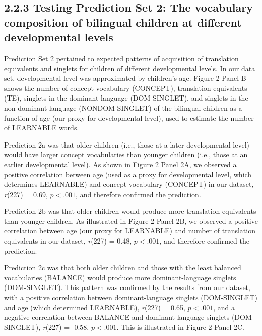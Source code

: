 \documentclass[
  english,
  ,man,floatsintext]{apa6}
\begin{document}
\hypertarget{testing-prediction-set-2-the-vocabulary-composition-of-bilingual-children-at-different-developmental-levels}{%
\subsection{2.2.3 Testing Prediction Set 2: The vocabulary composition of bilingual children at different developmental levels}\label{testing-prediction-set-2-the-vocabulary-composition-of-bilingual-children-at-different-developmental-levels}}

Prediction Set 2 pertained to expected patterns of acquisition of translation equivalents and singlets for children of different developmental levels. In our data set, developmental level was approximated by children's age. Figure 2 Panel B shows the number of concept vocabulary (CONCEPT), translation equivalents (TE), singlets in the dominant language (DOM-SINGLET), and singlets in the non-dominant language (NONDOM-SINGLET) of the bilingual children as a function of age (our proxy for developmental level), used to estimate the number of LEARNABLE words.

Prediction 2a was that older children (i.e., those at a later developmental level) would have larger concept vocabularies than younger children (i.e., those at an earlier developmental level). As shown in Figure 2 Panel 2A, we observed a positive correlation between age (used as a proxy for developmental level, which determines LEARNABLE) and concept vocabulary (CONCEPT) in our dataset, \emph{r}(227) = 0.69, \(p < .001\), and therefore confirmed the prediction.

Prediction 2b was that older children would produce more translation equivalents than younger children. As illustrated in Figure 2 Panel 2B, we observed a positive correlation between age (our proxy for LEARNABLE) and number of translation equivalents in our dataset, \emph{r}(227) = 0.48, \(p < .001\), and therefore confirmed the prediction.

Prediction 2c was that both older children and those with the least balanced vocabularies (BALANCE) would produce more dominant-language singlets (DOM-SINGLET). This pattern was confirmed by the results from our dataset, with a positive correlation between dominant-language singlets (DOM-SINGLET) and age (which determined LEARNABLE), \emph{r}(227) = 0.65, \(p < .001\), and a negative correlation between BALANCE and dominant-language singlets (DOM-SINGLET), \emph{r}(227) = -0.58, \(p < .001\). This is illustrated in Figure 2 Panel 2C.
\end{document}
